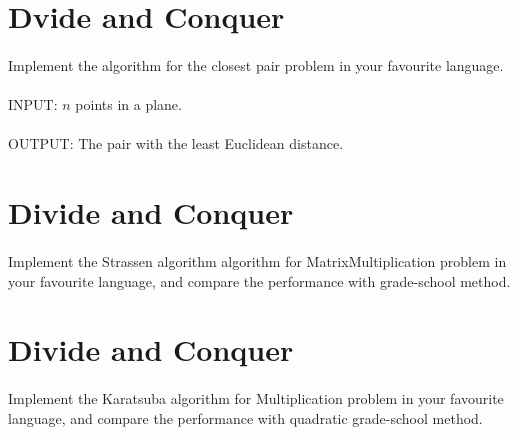 \documentclass[a4paper,11pt]{article}
\begin{document}
\section{Dvide and Conquer}

\paragraph{}Implement the algorithm for the closest pair problem in your favourite language.

\paragraph{} INPUT: $n$ points in a plane.

\paragraph{} OUTPUT: The pair with the least Euclidean distance.

\section{Divide and Conquer}

\paragraph{}Implement the Strassen algorithm algorithm for MatrixMultiplication problem in your favourite language, and compare the performance with grade-school method.\\

\section{Divide and Conquer}

\paragraph{}Implement the Karatsuba algorithm for Multiplication problem in your favourite language, and compare the performance with quadratic grade-school method.
\end{document}
